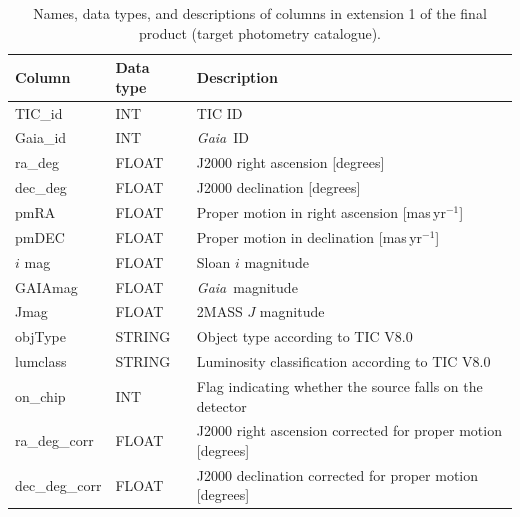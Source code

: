 \documentclass[fleqn,usenatbib]{mnras}
\newcommand{\gaia}{{\it Gaia}}
\begin{document}
\begin{table}
    \centering
    \caption{Names, data types, and descriptions of columns in extension 1 of the final product (target photometry catalogue).}
    \label{tab:final_product_cols_tab1}
    \begin{tabularx}{\columnwidth}{@{}ll>{\raggedright\arraybackslash}X@{}}
    \toprule
    Column & Data type & Description \\
    \midrule
    TIC\_id & INT & TIC ID \\
    Gaia\_id & INT & \gaia\ ID \\
    ra\_deg & FLOAT & J2000 right ascension [degrees] \\
    dec\_deg & FLOAT & J2000 declination [degrees] \\
    pmRA & FLOAT & Proper motion in right ascension [mas\,yr$^{-1}$] \\
    pmDEC & FLOAT & Proper motion in declination [mas\,yr$^{-1}$] \\
    $i$ mag & FLOAT & Sloan $i$ magnitude \\
    GAIAmag & FLOAT & \gaia\ magnitude \\
    Jmag & FLOAT & 2MASS $J$ magnitude \\
    objType & STRING & Object type according to TIC V8.0 \\
    lumclass & STRING & Luminosity classification according to TIC V8.0 \\
    on\_chip & INT & Flag indicating whether the source falls on the detector \\
    ra\_deg\_corr & FLOAT & J2000 right ascension corrected for proper motion [degrees] \\
    dec\_deg\_corr & FLOAT & J2000 declination corrected for proper motion [degrees] \\
    \bottomrule
    \end{tabularx}
\end{table}
\end{document}
